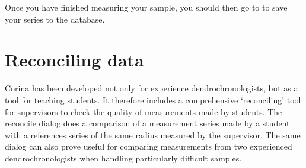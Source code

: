 Once you have finished measuring your sample, you should then go to  to save your series to the database. 

\section{Reconciling data}
Corina has been developed not only for experience dendrochronologists, but as a tool for teaching students.  It therefore includes a comprehensive `reconciling' tool for supervisors to check the quality of measurements made by students.  The reconcile dialog does a comparison of a measurement series made by a student with a references series of the same radius measured by the supervisor.  The same dialog can also prove useful for comparing measurements from two experienced dendrochronologists when handling particularly difficult samples.

 

